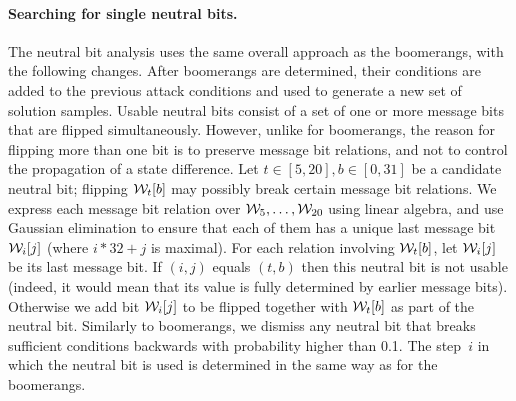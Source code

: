 \paragraph{Searching for single neutral bits.}
The neutral bit analysis uses the same overall approach as the boomerangs, with the following changes.
After boomerangs are determined, their conditions are added to the previous attack conditions and used to generate a new set of solution samples.
Usable neutral bits consist of a set of one or more message bits that are flipped simultaneously.
However, unlike for boomerangs, the reason for flipping more than one bit is to preserve message bit relations, and not to control the
propagation of a state difference.
Let $t\in[5,20], b\in[0,31]$ be a candidate neutral bit; flipping $\mathcal{W}_t[b]$ may possibly break certain message bit relations.
We express each message bit relation over $\mathcal{W}_5,\ldots,\mathcal{W}_{20}$ using linear algebra, 
and use Gaussian elimination to ensure that each of them has a unique last message bit $\mathcal{W}_i[j]$ (\ie where $i*32+j$ is maximal).
For each relation involving $\mathcal{W}_t[b]$, let $\mathcal{W}_i[j]$ be its last message bit.
If $(i,j)$ equals $(t,b)$ then this neutral bit is not usable (indeed, it would mean that its value is fully determined by earlier message bits).
Otherwise we add bit $\mathcal{W}_i[j]$ to be flipped together with $\mathcal{W}_t[b]$ as part of the neutral bit.
Similarly to boomerangs, we dismiss any neutral bit that breaks sufficient conditions backwards with probability higher than 0.1.
The step~$i$ in which the neutral bit is used is determined in the same way as for the boomerangs.

